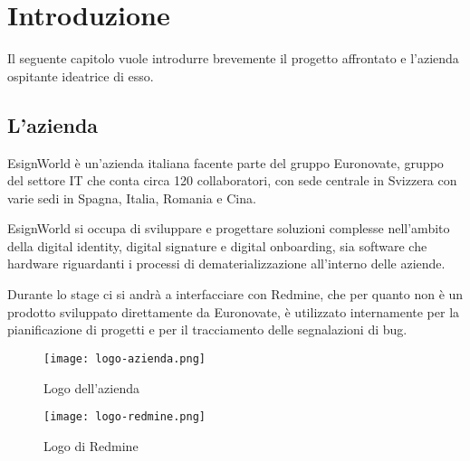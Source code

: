
\chapter{Introduzione}
\label{cap:introduzione}

Il seguente capitolo vuole introdurre brevemente il progetto affrontato e l'azienda ospitante ideatrice di esso. \\



\iffalse
\noindent Esempio di utilizzo di un termine nel glossario \\
\gls{api}. \\
\noindent Esempio di citazione in linea \\
\cite{site:agile-manifesto}. \\
\noindent Esempio di citazione nel pie' di pagina \\
citazione\footcite{womak:lean-thinking} \\
\fi


\section{L'azienda}

\par EsignWorld è un'azienda italiana facente parte del gruppo Euronovate, gruppo del settore IT che conta circa 120 collaboratori, con sede centrale in Svizzera con varie sedi in Spagna, Italia, Romania e Cina. 
\newline
\newline
\par EsignWorld si occupa di sviluppare e progettare soluzioni complesse nell'ambito della digital identity, digital signature e digital onboarding, sia software che hardware riguardanti i processi di dematerializzazione all'interno delle aziende.
\newline
\newline
\par Durante lo stage ci si andrà a interfacciare con Redmine, che per quanto non è un prodotto sviluppato direttamente da Euronovate, è utilizzato internamente per la pianificazione di progetti e per il tracciamento delle segnalazioni di bug.
\newline
\begin{figure}[!h] 
	\centering 
	\texttt{[image: logo-azienda.png]} 
	\caption{Logo dell'azienda}
\end{figure}
\begin{figure}[!h] 
	\centering 
	\texttt{[image: logo-redmine.png]} 
	\caption{Logo di Redmine}
\end{figure}

